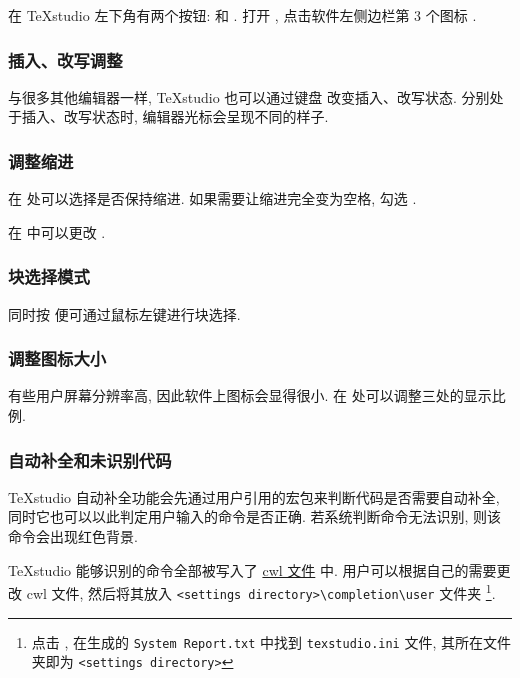 在 \TeX studio 左下角有两个按钮:
 和 .
打开 ,
点击软件左侧边栏第 3 个图标 .


\subsubsection{插入、改写调整}

与很多其他编辑器一样,
\TeX studio 也可以通过键盘 
改变插入、改写状态.
分别处于插入、改写状态时,
编辑器光标会呈现不同的样子.

\subsubsection{调整缩进}

在 
处可以选择是否保持缩进.
如果需要让缩进完全变为空格,
勾选 .

在  中可以更改 .

\subsubsection{块选择模式}

同时按  便可通过鼠标左键进行块选择.

\subsubsection{调整图标大小}

有些用户屏幕分辨率高,
因此软件上图标会显得很小.
在  处可以调整三处的显示比例.

\subsubsection{自动补全和未识别代码}

\TeX studio 自动补全功能会先通过用户引用的宏包来判断代码是否需要自动补全, 
同时它也可以以此判定用户输入的命令是否正确.
若系统判断命令无法识别,
则该命令会出现红色背景.

\TeX studio 能够识别的命令全部被写入了
\href{https://github.com/texstudio-org/texstudio/tree/master/completion}{cwl 文件}
中. 
用户可以根据自己的需要更改 cwl 文件,
然后将其放入
\texttt{<settings directory>\textbackslash completion\textbackslash user}
文件夹%
\footnote{点击 ,
在生成的 \texttt{System Report.txt} 中找到 \texttt{texstudio.ini} 文件,
其所在文件夹即为 \texttt{<settings directory>}}. 

